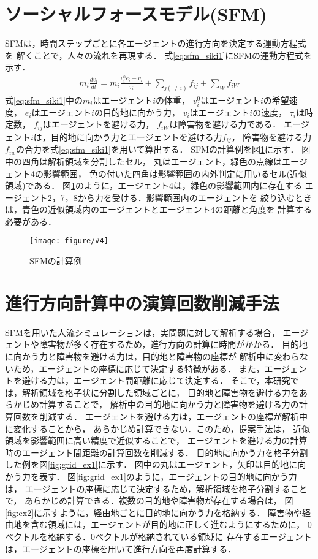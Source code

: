 \documentclass{maelab_y}
\newcommand{\figtb}[5]{ %
\begin{figure}[hbtp]
  \begin{center}
    \texttt{[image: figure/\#4]}
    \caption{#1}
    \label{fig:#5}
  \end{center}
\end{figure}
}%
\newcommand{\分類条件}{%
\begin{table}[t]
\begin{center}
\caption{進行方向を分類する条件}
\ecaption{Classification condition of moving direction $e_{i}$.}
\label{tb:hantei_jouken}
\begin{tabular}{c|c|c|c|c}
\hline \hline
			& 右 & 左 & 上 & 下 \\ \hline
パターン2   & $\frac{1}{\sqrt{2}} < e_x \leq 1  $
		    & $ -1 \leq e_x < \frac{-1}{\sqrt{2}}$ 
		    & $ \frac{-1}{\sqrt{2}} < e_x < \frac{1}{\sqrt{2}} $ 
		    & $ \frac{-1}{2} < e_x < \frac{1}{2} $ \\
パターン3   & $\frac{-1}{2} < e_y < \frac{1}{2} $ 
		    & $\frac{-1}{2} < e_y < \frac{1}{2} $
            & $ \frac{1}{\sqrt{2}} < e_y \leq 1$
		    & $ -1 \leq e_y < \frac{-1}{\sqrt{2}} $ \\
\hline
\multirow{2}{*}{パターン4}   
			& $R_x \geq A_x$ & $R_x < A_x$ & $R_y \geq A_y$ & $R_y < A_y $ \\
	        &  $L_x \geq A_x$ & $L_x < A_x$ & $L_y \geq A_y$ & $L_y < A_y$ \\
\hline
\multirow{2}{*}{パターン5}   
 			& $R_x \geq x_1$ & $R_x < x_2$ & $R_y \geq y_1$ & $R_y < y_2 $ \\
			& $L_x \geq x_1$ & $L_x < x_2$ & $L_y \geq y_1$ & $L_y < y_2 $ \\
\hline
パターン6   & $ \cos(\frac{1}{2}\theta_{view}) \leq  e_y $ 
			& $ e_y \leq -\cos(\frac{1}{2}\theta_{view})$ 
			& $ \sin(\frac{1}{2}(\pi - \theta_{view})) \leq e_x $ 
			& $ e_x \leq \sin(\frac{1}{2}(\pi - \theta_{view}))  $ \\
\hline
\end{tabular}
\end{center}
\end{table}
}%
\newcommand{\距離計算new}{%
  \begin{table}[hbtp]
    \begin{center}
    \caption{エージェント間距離の計算回数[$10^{10}$回]}
    \label{tab:my-table}
    \begin{tabular}{c|llllll}
    \hline \hline
    \multirow{2}{*}{人数}   & \multicolumn{6}{c}{パターン}                                                                                                                                                             \\ \cline{2-7} 
                          & \multicolumn{1}{c|}{1}    & \multicolumn{1}{c|}{2}               & \multicolumn{1}{c|}{3}      & \multicolumn{1}{c|}{4}      & \multicolumn{1}{c|}{5}      & \multicolumn{1}{c}{6}    \\ \hline
    \multirow{2}{*}{3000} & \multicolumn{1}{r|}{5.1}  & \multicolumn{1}{r|}{\textbf{3.9}}    & \multicolumn{1}{r|}{4.0}    & \multicolumn{1}{r|}{4.4}    & \multicolumn{1}{r|}{4.1}    & \multicolumn{1}{r}{4.4}  \\
                          & \multicolumn{1}{l|}{}     & \multicolumn{1}{l|}{\textbf{(24\%)}} & \multicolumn{1}{l|}{(23\%)} & \multicolumn{1}{l|}{(15\%)} & \multicolumn{1}{l|}{(21\%)} & (15\%)                   \\ \hline
    \multirow{2}{*}{5000} & \multicolumn{1}{r|}{14.4} & \multicolumn{1}{r|}{\textbf{10.9}}   & \multicolumn{1}{r|}{11.1}   & \multicolumn{1}{r|}{12.2}   & \multicolumn{1}{r|}{11.4}   & \multicolumn{1}{r}{12.2} \\
                          & \multicolumn{1}{l|}{}     & \multicolumn{1}{l|}{\textbf{(24\%)}} & \multicolumn{1}{l|}{(23\%)} & \multicolumn{1}{l|}{(15\%)} & \multicolumn{1}{l|}{(21\%)} & (15\%)                   \\ \hline
    \multirow{2}{*}{7500} & \multicolumn{1}{r|}{33.1} & \multicolumn{1}{r|}{\textbf{25.2}}   & \multicolumn{1}{r|}{25.8}   & \multicolumn{1}{r|}{28.3}   & \multicolumn{1}{r|}{26.7}   & \multicolumn{1}{r}{28.3} \\
                          & \multicolumn{1}{l|}{}     & \multicolumn{1}{l|}{\textbf{(24\%)}} & \multicolumn{1}{l|}{(22\%)} & \multicolumn{1}{l|}{(15\%)} & \multicolumn{1}{l|}{(20\%)} & (15\%)                   \\ \hline
    \end{tabular}
    \end{center}
    \end{table}
}%
\newcommand{\粒子数}{%
\begin{table}[hbtp]
  \begin{center}
    \caption{各配置の詳細}
    \label{tb:haichi_para}
    \begin{tabular}{c|c|c}
      \hline \hline
      & 教室 & 演習室 \\ \hline 
      エージェント数[人] & 96 & 204 \\ \hline
      壁粒子数[個] & 1037 & 1454\\ \hline
      経由地数[個] & 12   & 26 \\ \hline
      解析領域 & $50m\times50m$ & $50m\times50m$ \\ \hline
    \end{tabular}
  \end{center}
\end{table}
}%
\newcommand{\評価環境}{%
\begin{table}[hbtp]
  \begin{center}
    \caption{各配置の詳細}
    \label{tb:haichi_para}
    \begin{tabular}{c|c|c}
      \hline \hline
                 & マシン1                & マシン2 \\ \hline 
      CPU        & Intel Xeon E5-2687W & Intel Xeon E5-2667W \\ \hline
      メモリ     & 64GB                   & 64GB \\ \hline
      OS         & Linux 4.12.9            & Linux 6.5.8 \\ \hline
      コンパイラ & gcc 7.2.0             & gcc 13.2.0 \\ \hline
    \end{tabular}
  \end{center}
\end{table}
}%
\newcommand{\判定条件new}{%
  \begin{table}[hbtp]
    \centering
		\caption{パターンごとの進行方向分類条件}
		\label{tb:joken}
		{\scriptsize
    \begin{tabular}{Wc{0.5em}|cccWc{8em}}
    \hline \hline
    \multirow{2}{*}{} & \multicolumn{4}{c}{パターン}                                                                             \\ \cline{2-5} 
                          & \multicolumn{1}{c|}{2,3} & \multicolumn{1}{c|}{4}   & \multicolumn{1}{c|}{5}   & 6                   \\ \hline
    \multirow{2}{*}{右}    & \multicolumn{1}{c|}{$\frac{1}{\sqrt{2}} < e_x \leq 1$}  & \multicolumn{1}{c|}{$R_x \geq A_x$}  & \multicolumn{1}{c|}{$R_x \geq x_1$}  & \multirow{2}{*}{$ \cos(\frac{1}{2}\theta_v) \leq  e_y $} \\
                          & \multicolumn{1}{c|}{$\frac{-1}{2} < e_y < \frac{1}{2} $}   & \multicolumn{1}{l|}{$L_x \geq A_x$} & \multicolumn{1}{l|}{$L_x \geq x_1$} &                     \\ \hline
    \multirow{2}{*}{左}    & \multicolumn{1}{c|}{$ -1 \leq e_x < \frac{-1}{\sqrt{2}}$}  & \multicolumn{1}{c|}{$R_x < A_x$}  & \multicolumn{1}{c|}{$R_x < x_2$}  & \multirow{2}{*}{$ e_y \leq -\cos(\frac{1}{2}\theta_{v})$} \\
                          & \multicolumn{1}{l|}{$\frac{-1}{2} < e_y < \frac{1}{2} $}   & \multicolumn{1}{l|}{$L_x < A_x$} & \multicolumn{1}{l|}{$L_x < x_2$ } &                     \\ \hline
    \multirow{2}{*}{上}    & \multicolumn{1}{c|}{$ \frac{-1}{\sqrt{2}} < e_x < \frac{1}{\sqrt{2}}$}  & \multicolumn{1}{c|}{$R_y \geq A_y$ }  & \multicolumn{1}{c|}{$R_y \geq y_1$ }  & \multirow{2}{*}{$ \sin(\frac{1}{2}(\theta_{\pi - v})) \leq e_x$} \\
                          & \multicolumn{1}{l|}{$ \frac{1}{\sqrt{2}} < e_y \leq 1$}   & \multicolumn{1}{l|}{$L_y \geq A_y$} & \multicolumn{1}{l|}{$L_y \geq y_1$} &                     \\ \hline
    \multirow{2}{*}{下}    & \multicolumn{1}{c|}{$ \frac{-1}{2} < e_x < \frac{1}{2} $}  & \multicolumn{1}{c|}{$R_y < A_y $}  & \multicolumn{1}{c|}{$R_y < y_2 $ }  & \multirow{2}{*}{$ e_x \leq \sin(\frac{1}{2}(\theta_{\pi - v}))$} \\
                          & \multicolumn{1}{l|}{$ -1 \leq e_y < \frac{-1}{\sqrt{2}} $}   & \multicolumn{1}{l|}{$L_y < A_y$} & \multicolumn{1}{l|}{$L_y < y_2 $ } &                     \\ \hline
    \end{tabular}
		}
    \end{table}
}%
\begin{document}
\section{ソーシャルフォースモデル(SFM)}
SFMは，時間ステップごとに各エージェントの進行方向を決定する運動方程式を
解くことで，人々の流れを再現する．
式\eqref{eq:sfm_siki1}にSFMの運動方程式を示す．
%
\begin{align} \label{eq:sfm_siki1}
  m_i \frac{dv_i}{dt} = m_i \frac{v_i^0 e_i - v_i}{\tau_i}
  +\sum_{j(\neq i)}f_{ij}+\sum_{W}f_{iW}
\end{align}
%
式\eqref{eq:sfm_siki1}中の$m_i$はエージェント$i$の体重，
$v_i^0$はエージェント$i$の希望速度，
$e_i$はエージェント$i$の目的地に向かう力，
$v_i$はエージェント$i$の速度，
$\tau_i$は時定数，
$f_{ij}$はエージェントを避ける力，
$f_{iW}$は障害物を避ける力である．
エージェント$i$は，目的地に向かう力とエージェントを避ける力$f_{ij}$，
障害物を避ける力$f_{iw}$の合力を式\eqref{eq:sfm_siki1}を用いて算出する．
SFMの計算例を図\ref{fig:sfm_ex}に示す．
図中の四角は解析領域を分割したセル，
丸はエージェント，緑色の点線はエージェント4の影響範囲，
色の付いた四角は影響範囲の内外判定に用いるセル(近似領域)である．
図\ref{fig:sfm_ex}のように，エージェント4は，緑色の影響範囲内に存在する
エージェント2，7，8から力を受ける．影響範囲内のエージェントを
絞り込むときは，青色の近似領域内のエージェントとエージェント4の距離と角度を
計算する必要がある．

\figtb{SFMの計算例}{}{8}{20231226_sfm_ex.eps}{sfm_ex}

\section{進行方向計算中の演算回数削減手法}
SFMを用いた人流シミュレーションは，実問題に対して解析する場合，
エージェントや障害物が多く存在するため，進行方向の計算に時間がかかる．
目的地に向かう力と障害物を避ける力は，目的地と障害物の座標が
解析中に変わらないため，エージェントの座標に応じて決定する特徴がある．
また，エージェントを避ける力は，エージェント間距離に応じて決定する．
そこで，本研究では，解析領域を格子状に分割した領域ごとに，
目的地と障害物を避ける力をあらかじめ計算することで，
解析中の目的地に向かう力と障害物を避ける力の計算回数を削減する．
エージェントを避ける力は，エージェントの座標が解析中に変化することから，
あらかじめ計算できない．このため，提案手法は，
近似領域を影響範囲に高い精度で近似することで，
エージェントを避ける力の計算時のエージェント間距離の計算回数を削減する．
目的地に向かう力を格子分割した例を図\ref{fig:grid_ex1}に示す．
図中の丸はエージェント，矢印は目的地に向かう力を表す．
図\ref{fig:grid_ex1}のように，エージェントの目的地に向かう力は，
エージェントの座標に応じて決定するため，解析領域を格子分割することで，
あらかじめ計算できる．複数の目的地や障害物が存在する場合は，
図\ref{fig:ex2}に示すように，経由地ごとに目的地に向かう力を格納する．
障害物や経由地を含む領域には，エージェントが目的地に正しく進むようにするために，
0ベクトルを格納する．0ベクトルが格納されている領域に
存在するエージェントは，エージェントの座標を用いて進行方向を再度計算する．
\end{document}
